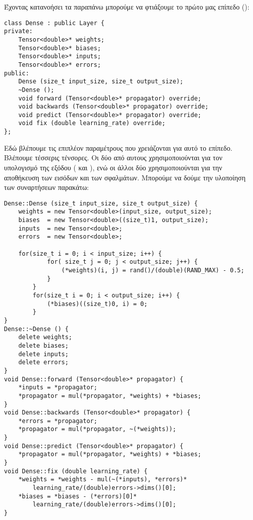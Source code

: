 Έχοντας κατανοήσει τα παραπάνω μπορούμε να φτιάξουμε το πρώτο μας επίπεδο ():
\begin{otherlanguage}{english}
\begin{lstlisting}[style=cppstyle,caption= Dense layer in hpp file]
class Dense : public Layer {
private:
    Tensor<double>* weights;
    Tensor<double>* biases;
    Tensor<double>* inputs;
    Tensor<double>* errors;
public:
    Dense (size_t input_size, size_t output_size);
    ~Dense ();
    void forward (Tensor<double>* propagator) override;
    void backwards (Tensor<double>* propagator) override;
    void predict (Tensor<double>* propagator) override;
    void fix (double learning_rate) override;
};
\end{lstlisting}
\end{otherlanguage}
Εδώ βλέπουμε τις επιπλέον παραμέτρους που χρειάζονται για αυτό το επίπεδο. Βλέπουμε τέσσερις τένσορες. Οι δύο από αυτους χρησιμοποιούνται για τον υπολογισμό της εξόδου ( και ), ενώ οι άλλοι δύο χρησιμοποιούνται για
την αποθήκευση των εισόδων και των σφαλμάτων. Μπορούμε να δούμε την υλοποίηση των συναρτήσεων παρακάτω:
\begin{otherlanguage}{english}
\begin{lstlisting}[style=cppstyle,caption= Dense layer in cpp file]
Dense::Dense (size_t input_size, size_t output_size) {
    weights = new Tensor<double>(input_size, output_size);
    biases  = new Tensor<double>((size_t)1, output_size);
    inputs  = new Tensor<double>;
    errors  = new Tensor<double>;

    for(size_t i = 0; i < input_size; i++) {
            for( size_t j = 0; j < output_size; j++) {
                (*weights)(i, j) = rand()/(double)(RAND_MAX) - 0.5;
            }
        }
        for(size_t i = 0; i < output_size; i++) {
            (*biases)((size_t)0, i) = 0;
        }
}
Dense::~Dense () {
    delete weights;
    delete biases;
    delete inputs;
    delete errors;
}
void Dense::forward (Tensor<double>* propagator) {
    *inputs = *propagator;
    *propagator = mul(*propagator, *weights) + *biases;
}
void Dense::backwards (Tensor<double>* propagator) {
    *errors = *propagator;
    *propagator = mul(*propagator, ~(*weights));
}
void Dense::predict (Tensor<double>* propagator) {
    *propagator = mul(*propagator, *weights) + *biases;
}
void Dense::fix (double learning_rate) {
    *weights = *weights - mul(~(*inputs), *errors)*
        learning_rate/(double)errors->dims()[0];
    *biases = *biases - (*errors)[0]*
        learning_rate/(double)errors->dims()[0];
}
\end{lstlisting}
\end{otherlanguage}
